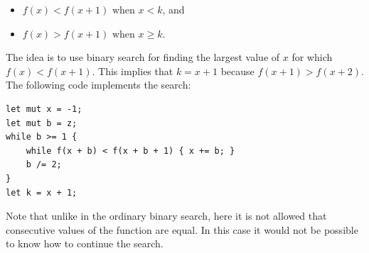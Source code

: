 \begin{itemize}
\item
$f(x)<f(x+1)$ when $x<k$, and
\item
$f(x)>f(x+1)$ when $x \ge k$.
\end{itemize}

The idea is to use binary search
for finding the largest value of $x$
for which $f(x)<f(x+1)$.
This implies that $k=x+1$
because $f(x+1)>f(x+2)$.
The following code implements the search: 

\begin{lstlisting}
let mut x = -1;
let mut b = z;
while b >= 1 {
    while f(x + b) < f(x + b + 1) { x += b; }
    b /= 2;
}
let k = x + 1;
\end{lstlisting}

Note that unlike in the ordinary binary search,
here it is not allowed that consecutive values
of the function are equal.
In this case it would not be possible to know
how to continue the search.
